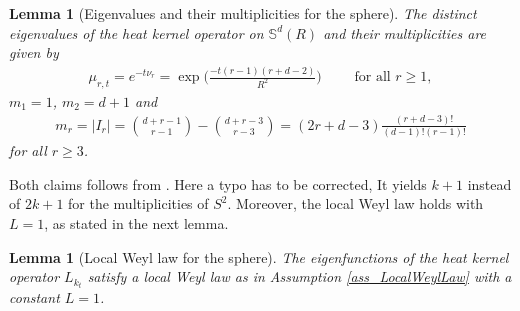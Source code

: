 \documentclass[a4paper,11pt]{article} %
\numberwithin{equation}{section}
\theoremstyle{definition}
\theoremstyle{remark}
\theoremstyle{plain}
\newtheorem{lemma}[definition]{Lemma}
\begin{document}
\begin{lemma}[Eigenvalues and their multiplicities for the sphere]
  \label{lem_HeatKernelEigenvaluesAndTheirMultiplicities}
  The distinct eigenvalues of the heat kernel operator on \( \mathbb{S}^{d}(R) \) and their multiplicities are given by
  \begin{align}
    \mu_{r, t} = e^{- t \nu_{r}} = \exp \Big( \frac{- t (r - 1) (r + d - 2)}{R^{2}} \Big)
    \qquad \text{ for all } r \ge 1,
  \end{align}
  \( m_{1} = 1 \), \( m_{2} = d + 1 \) and 
  \begin{align}
    m_{r}= |I_r| = \binom{d + r - 1}{r - 1} - \binom{d + r - 3}{r - 3}
          = (2 r + d - 3) \frac{(r+d-3)!}{(d-1)!(r-1)!}
  \end{align}
  for all \( r \ge 3 \).
\end{lemma}

  Both claims follows from \cite[Chapter II.4]{MR768584}. Here a typo has to be corrected, It yields \( k + 1 \) instead of \( 2 k + 1 \) for the multiplicities of \( S^{2} \). 
  Moreover, the local Weyl law holds with $L=1$, as stated in the next lemma.

\begin{lemma}[Local Weyl law for the sphere]%
  \label{lem_LocalWeylLawForTheSphere}
  The eigenfunctions of the heat kernel operator \( L_{k_{t}} \) satisfy a local Weyl law as in Assumption \ref{ass_LocalWeylLaw} with a constant \( L = 1 \).
\end{lemma}%
\end{document}
